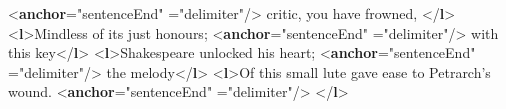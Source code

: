\begin{shaded}
{<\textbf{anchor}\hspace*{1em}{subtype}="{sentenceEnd}"\mbox{}\newline 
\hspace*{1em}\hspace*{1em}{type}="{delimiter}"/>}\mbox{}\newline 
{} critic, you have frowned,\mbox{}\newline 
{</\textbf{l}>}\mbox{}\newline 
{<\textbf{l}>}Mindless of its just honours; {<\textbf{anchor}\hspace*{1em}{subtype}="{sentenceEnd}"\mbox{}\newline 
\hspace*{1em}\hspace*{1em}{type}="{delimiter}"/>}\mbox{}\newline 
{} with this key{</\textbf{l}>}\mbox{}\newline 
{<\textbf{l}>}Shakespeare unlocked his heart; {<\textbf{anchor}\hspace*{1em}{subtype}="{sentenceEnd}"\mbox{}\newline 
\hspace*{1em}\hspace*{1em}{type}="{delimiter}"/>}\mbox{}\newline 
{} the melody{</\textbf{l}>}\mbox{}\newline 
{<\textbf{l}>}Of this small lute gave ease to Petrarch's wound. {<\textbf{anchor}\hspace*{1em}{subtype}="{sentenceEnd}"\mbox{}\newline 
\hspace*{1em}\hspace*{1em}{type}="{delimiter}"/>}\mbox{}\newline 
{</\textbf{l}>}\end{shaded}\egroup\par \par

